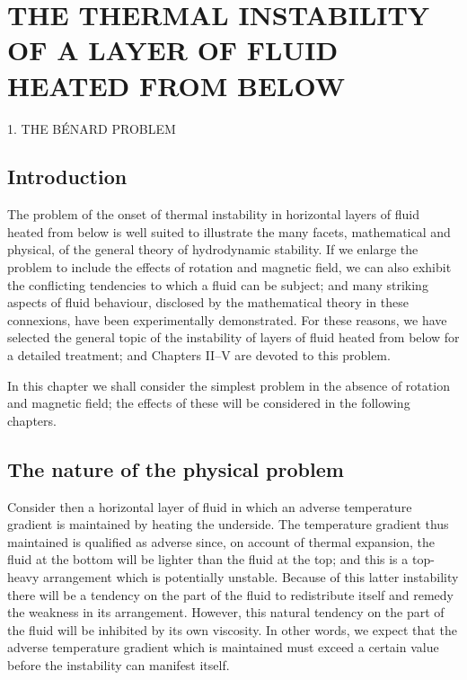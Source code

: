 
\chapter{THE THERMAL INSTABILITY OF A LAYER OF FLUID HEATED FROM BELOW}
\label{ch:2}

\begin{center}
  {\Large 1. THE B\'ENARD PROBLEM}
\end{center}

\section{Introduction}\label{sec:5}

The problem of the onset of thermal instability in horizontal layers of
fluid heated from below is well suited to illustrate the many facets,
mathematical and physical, of the general theory of hydrodynamic
stability. If we enlarge the problem to include the effects of rotation
and magnetic field, we can also exhibit the conflicting tendencies to
which a fluid can be subject; and many striking aspects of fluid behaviour,
disclosed by the mathematical theory in these connexions, have been
experimentally demonstrated. For these reasons, we have selected the
general topic of the instability of layers of fluid heated from below for a
detailed treatment; and Chapters II--V are devoted to this problem.

In this chapter we shall consider the simplest problem in the absence
of rotation and magnetic field; the effects of these will be considered in
the following chapters.

\section{The nature of the physical problem}\label{sec:6}

Consider then a horizontal layer of fluid in which an adverse temperature
gradient is maintained by heating the underside. The temperature
gradient thus maintained is qualified as adverse since, on account of
thermal expansion, the fluid at the bottom will be lighter than the fluid
at the top; and this is a top-heavy arrangement which is potentially
unstable. Because of this latter instability there will be a tendency on
the part of the fluid to redistribute itself and remedy the weakness in
its arrangement. However, this natural tendency on the part of the
fluid will be inhibited by its own viscosity. In other words, we expect
that the adverse temperature gradient which is maintained must exceed
a certain value before the instability can manifest itself.

